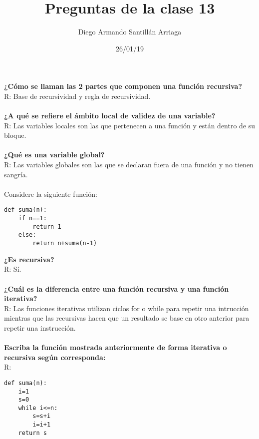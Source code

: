\documentclass[letterpaper, 12pt, oneside]{article}%
\title{\Huge Preguntas de la clase 13}
\author{Diego Armando Santillán Arriaga}
\date{26/01/19}
\begin{document}
	\maketitle
	\newpage
\textbf{¿Cómo se llaman las 2 partes que componen una función recursiva?}
\\
R: Base de recursividad y regla de recursividad. 
\\\\
\textbf{¿A qué se refiere el ámbito local de validez de una variable?}
\\
R: Las variables locales son las que pertenecen a una función y están dentro de su bloque. 
\\\\
\textbf{¿Qué es una variable global?}
\\
R: Las variables globales son las que se declaran fuera de una función y no tienen sangría. 
\\\\
Considere la siguiente función:
\begin{verbatim}
def suma(n):
    if n==1:
        return 1
    else:
        return n+suma(n-1)   
\end{verbatim}
\textbf{¿Es recursiva?}
\\
R: Sí.
\\\\
\textbf{¿Cuál es la diferencia entre una función recursiva y una función iterativa?}
\\
R: Las funciones iterativas utilizan ciclos for o while para repetir una intrucción mientras que las recursivas hacen que un resultado se base en otro anterior para repetir una instrucción.
\\\\
\textbf{Escriba la función mostrada anteriormente de forma iterativa o recursiva según corresponda:}
\\
R:
\begin{verbatim}
def suma(n):
    i=1
    s=0
    while i<=n:
        s=s+i
        i=i+1
    return s   
\end{verbatim}
\end{document}
